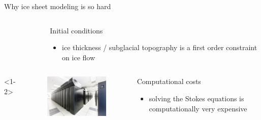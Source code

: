 \documentclass[hide notes,intlimits]{beamer}
\begin{document}
\begin{frame}{Why ice sheet modeling is so hard}
\begin{columns}[c]
\begin{column}{.28\linewidth}
\begin{figure}
        \end{figure}
      \end{column}
      \begin{column}{.67\linewidth}
        \begin{block}{Initial conditions}
        \begin{itemize}
        \item ice thickness / subglacial topography is a first order constraint on ice flow
        \end{itemize}
      \end{block}
      \end{column}
    \end{columns}
    \begin{columns}[c]<1-2>
      \begin{column}{.3\linewidth}
        \begin{figure}
          \includegraphics[width=\linewidth]{bw_front_sm}
        \end{figure}
      \end{column}
      \begin{column}{.67\linewidth}
        \begin{block}{Computational costs}
        \begin{itemize}
        \item solving the Stokes equations is computationally very expensive
        \end{itemize}
      \end{block}
      \end{column}
    \end{columns}
\end{frame}
\end{document}

